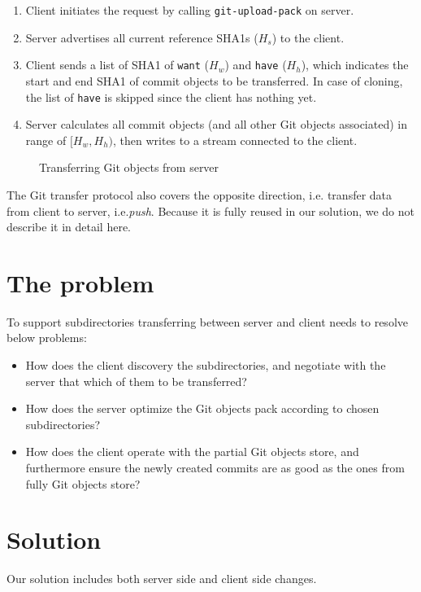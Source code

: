 \documentclass[preprint]{sigplanconf}
\begin{document}
\begin{enumerate}
  \item Client initiates the request by calling \verb|git-upload-pack| on
    server.

  \item Server advertises all current reference SHA1s ($H_s$) to the client.

  \item Client sends a list of SHA1 of \verb|want| ($H_w$) and \verb|have|
    ($H_h$), which indicates the start and end SHA1 of commit objects to be
    transferred.
    In case of cloning, the list of \verb|have| is skipped since the client has
    nothing yet.

  \item Server calculates all commit objects (and all other Git objects
    associated) in range of $[H_w, H_h)$, then writes to a stream connected to
    the client.
\end{enumerate}

\begin{figure}[htpb]
  \centering
  
  \caption{Transferring Git objects from server}
  \label{fig:git-proto-clone-seq}
\end{figure}
The Git transfer protocol also covers the opposite direction, i.e. transfer
data from client to server, i.e.\emph{push}.
Because it is fully reused in our solution, we do not describe it in detail
here.

\section{The problem}
To support subdirectories transferring between server and client needs to
resolve below problems:
\begin{itemize}
  \item How does the client discovery the subdirectories, and negotiate with
      the server that which of them to be transferred?

  \item How does the server optimize the Git objects pack according to chosen
      subdirectories?

  \item How does the client operate with the partial Git objects store, and
      furthermore ensure the newly created commits are as good as the ones
      from fully Git objects store?
\end{itemize}

\section{Solution}
Our solution includes both server side and client side changes.
\end{document}
